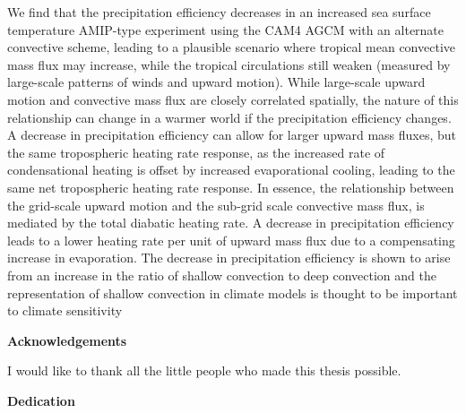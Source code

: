 We find that the precipitation efficiency decreases in an increased sea surface temperature AMIP-type experiment using the CAM4 AGCM with an alternate convective scheme, leading to a plausible scenario where tropical mean convective mass flux may increase, while the tropical circulations still weaken (measured by large-scale patterns of winds and upward motion). While large-scale upward motion and convective mass flux are closely correlated spatially, the nature of this relationship can change in a warmer world if the precipitation efficiency changes. A decrease in precipitation efficiency can allow for larger upward mass fluxes, but the same tropospheric heating rate response, as the increased rate of condensational heating is offset by increased evaporational cooling, leading to the same net tropospheric heating rate response. In essence, the relationship between the grid-scale upward motion and the sub-grid scale convective mass flux, is mediated by the total diabatic heating rate. A decrease in precipitation efficiency leads to a lower heating rate per unit of upward mass flux due to a compensating increase in evaporation. The decrease in precipitation efficiency is shown to arise from an increase in the ratio of shallow convection to deep convection and the representation of shallow convection in climate models is thought to be important to climate sensitivity
\cleardoublepage


\begin{center}\textbf{Acknowledgements}\end{center}

I would like to thank all the little people who made this thesis possible.
\cleardoublepage


\begin{center}\textbf{Dedication}\end{center}

\cleardoublepage

\renewcommand\contentsname{Table of Contents}
\tableofcontents
\cleardoublepage
{}    %

\listoftables
\cleardoublepage
{}		%

\listoffigures
\cleardoublepage
{}		%

\cleardoublepage
{}		%


